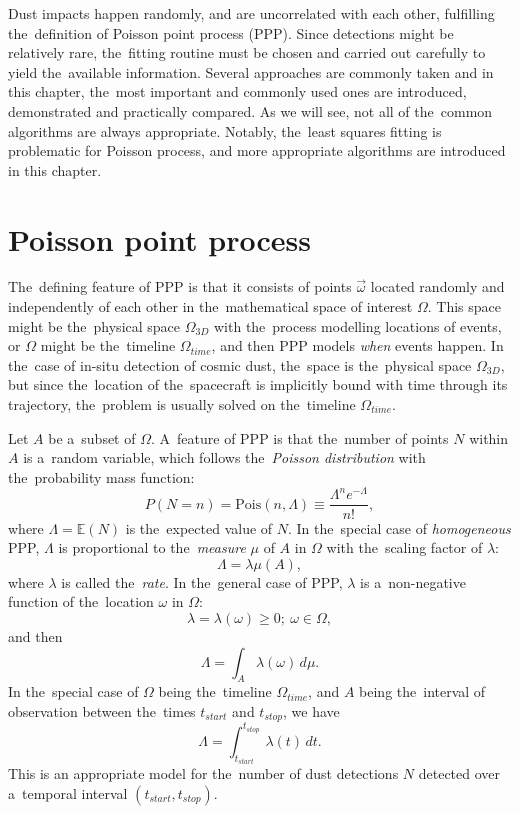 Dust impacts happen randomly, and are uncorrelated with each other, fulfilling the~definition of {Poisson point process} (PPP). Since detections might be relatively rare, the~fitting routine must be chosen and carried out carefully to yield the~available information. Several approaches are commonly taken and in this chapter, the~most important and commonly used ones are introduced, demonstrated and practically compared. As we will see, not all of the~common algorithms are always appropriate. Notably, the~least squares fitting is problematic for Poisson process, and more appropriate algorithms are introduced in this chapter.

\section{Poisson point process}

The~defining feature of PPP is that it consists of points $\vec{\omega}$ located randomly and independently of each other in the~mathematical space of interest $\Omega$. This space might be the~physical space $\Omega_{3D}$ with the~process modelling locations of events, or $\Omega$ might be the~timeline $\Omega_{time}$, and then PPP models \textit{when} events happen. In the~case of in-situ detection of cosmic dust, the~space is the~physical space $\Omega_{3D}$, but since the~location of the~spacecraft is implicitly bound with time through its trajectory, the~problem is usually solved on the~timeline $\Omega_{time}$.

Let $A$ be a~subset of $\Omega$. A~feature of PPP is that the~number of points $N$ within $A$ is a~random variable, which follows the~\textit{Poisson distribution} with the~probability mass function:
\begin{equation}
    P(N=n) = \mathrm{Pois}(n,\Lambda) \equiv \frac{\Lambda^n e^{-\Lambda}}{n!}, \label{eq:poisson_pmf}
\end{equation}
where $\Lambda = \mathbb{E}(N)$ is the~expected value of $N$. In the~special case of \textit{homogeneous} PPP, $\Lambda$ is proportional to the~\textit{measure} $\mu$ of $A$ in $\Omega$ with the~scaling factor of $\lambda$:
\begin{equation}
    \Lambda = \lambda \mu(A),
\end{equation}
where $\lambda$ is called the~\textit{rate}. In the~general case of PPP, $\lambda$ is a~non-negative function of the~location $\omega$ in $\Omega$:
\begin{equation}
    \lambda = \lambda(\omega) \geq 0; \ \omega \in \Omega,
\end{equation}
and then 
\begin{equation}
    \Lambda = \int_A \lambda(\omega) \, d\mu.
\end{equation}
In the~special case of $\Omega$ being the~timeline $\Omega_{time}$, and $A$ being the~interval of observation between the~times $t_{start}$ and $t_{stop}$, we have
\begin{equation}
    \Lambda = \int_{t_{start}}^{t_{stop}} \lambda(t) \, dt.
\end{equation}
This is an appropriate model for the~number of dust detections $N$ detected over a~temporal interval $(t_{start},t_{stop})$.


